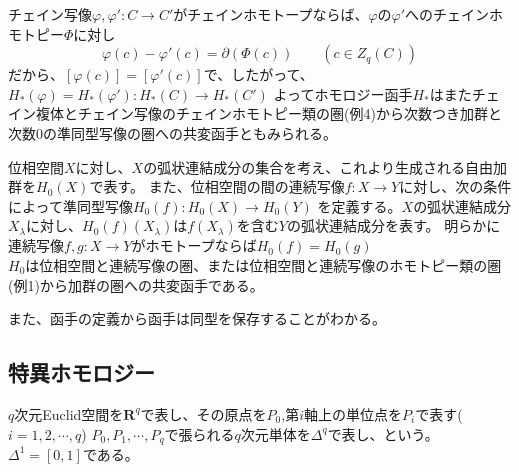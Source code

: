 \documentclass[dvipdfmx,a4paper,11pt]{jsarticle}
\begin{document}
\begin{tcolorbox}[title = 例6]
  チェイン写像$\varphi,\varphi' : C\to C'$がチェインホモトープならば、$\varphi$の$\varphi'$へのチェインホモトピー$\Phi$に対し
  \begin{equation*}
    \varphi(c)-\varphi'(c)=\partial(\Phi(c))\qquad (c\in Z_{q}(C))
  \end{equation*}
  だから、$[\varphi(c)]=[\varphi'(c)]$で、したがって、$H_{*}(\varphi)=H_{*}(\varphi'):H_{*}(C)\to H_{*}(C')$
  よってホモロジー函手$H_{*}$はまたチェイン複体とチェイン写像のチェインホモトピー類の圏(例4)から次数つき加群と次数$0$の準同型写像の圏への共変函手ともみられる。
\end{tcolorbox}

\clearpage

\begin{tcolorbox}[title = 例7]
  位相空間$X$に対し、$X$の弧状連結成分の集合を考え、これより生成される自由加群を$H_{0}(X)$で表す。
  また、位相空間の間の連続写像$f:X\to Y$に対し、次の条件によって準同型写像$H_{0}(f):H_{0}(X)\to H_{0}(Y)$
  を定義する。$X$の弧状連結成分$X_{\lambda}$に対し、$H_{0}(f)(X_{\lambda})$は$f(X_{\lambda})$を含む$Y$の弧状連結成分を表す。
  明らかに連続写像$f,g:X\to Y$がホモトープならば$H_{0}(f)=H_{0}(g)$\\
  $H_{0}$は位相空間と連続写像の圏、または位相空間と連続写像のホモトピー類の圏(例1)から加群の圏への共変函手である。
\end{tcolorbox}
また、函手の定義から函手は同型を保存することがわかる。

\subsection{特異ホモロジー}
$q$次元Euclid空間を$\mathbf{R}^q$で表し、その原点を$P_0$,第$i$軸上の単位点を$P_i$で表す($i=1,2,\cdots,q$)
$P_{0},P_{1},\cdots,P_{q}$で張られる$q$次元単体を$\Delta^q$で表し、という。$\Delta^1=[0,1]$である。
\end{document}
